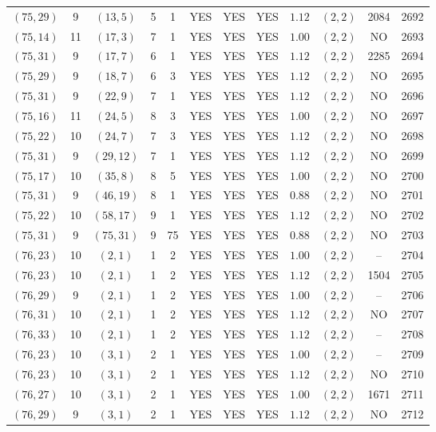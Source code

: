 \begin{longtable}{|c|c|c|c|c|c|c|c|c|c|c|c|}
$(75,29)$ & 9 & $(13,5)$ & 5 & 1 & YES & YES & YES & $1.12$ & $(2,2)$ & 2084 & 2692\\
$(75,14)$ & 11 & $(17,3)$ & 7 & 1 & YES & YES & YES & $1.00$ & $(2,2)$ & NO & 2693\\
$(75,31)$ & 9 & $(17,7)$ & 6 & 1 & YES & YES & YES & $1.12$ & $(2,2)$ & 2285 & 2694\\
$(75,29)$ & 9 & $(18,7)$ & 6 & 3 & YES & YES & YES & $1.12$ & $(2,2)$ & NO & 2695\\
$(75,31)$ & 9 & $(22,9)$ & 7 & 1 & YES & YES & YES & $1.12$ & $(2,2)$ & NO & 2696\\
$(75,16)$ & 11 & $(24,5)$ & 8 & 3 & YES & YES & YES & $1.00$ & $(2,2)$ & NO & 2697\\
$(75,22)$ & 10 & $(24,7)$ & 7 & 3 & YES & YES & YES & $1.12$ & $(2,2)$ & NO & 2698\\
$(75,31)$ & 9 & $(29,12)$ & 7 & 1 & YES & YES & YES & $1.12$ & $(2,2)$ & NO & 2699\\
$(75,17)$ & 10 & $(35,8)$ & 8 & 5 & YES & YES & YES & $1.00$ & $(2,2)$ & NO & 2700\\
$(75,31)$ & 9 & $(46,19)$ & 8 & 1 & YES & YES & YES & $0.88$ & $(2,2)$ & NO & 2701\\
$(75,22)$ & 10 & $(58,17)$ & 9 & 1 & YES & YES & YES & $1.12$ & $(2,2)$ & NO & 2702\\
$(75,31)$ & 9 & $(75,31)$ & 9 & 75 & YES & YES & YES & $0.88$ & $(2,2)$ & NO & 2703\\
$(76,23)$ & 10 & $(2,1)$ & 1 & 2 & YES & YES & YES & $1.00$ & $(2,2)$ & -- & 2704\\
$(76,23)$ & 10 & $(2,1)$ & 1 & 2 & YES & YES & YES & $1.12$ & $(2,2)$ & 1504 & 2705\\
$(76,29)$ & 9 & $(2,1)$ & 1 & 2 & YES & YES & YES & $1.00$ & $(2,2)$ & -- & 2706\\
$(76,31)$ & 10 & $(2,1)$ & 1 & 2 & YES & YES & YES & $1.12$ & $(2,2)$ & NO & 2707\\
$(76,33)$ & 10 & $(2,1)$ & 1 & 2 & YES & YES & YES & $1.12$ & $(2,2)$ & -- & 2708\\
$(76,23)$ & 10 & $(3,1)$ & 2 & 1 & YES & YES & YES & $1.00$ & $(2,2)$ & -- & 2709\\
$(76,23)$ & 10 & $(3,1)$ & 2 & 1 & YES & YES & YES & $1.12$ & $(2,2)$ & NO & 2710\\
$(76,27)$ & 10 & $(3,1)$ & 2 & 1 & YES & YES & YES & $1.00$ & $(2,2)$ & 1671 & 2711\\
$(76,29)$ & 9 & $(3,1)$ & 2 & 1 & YES & YES & YES & $1.12$ & $(2,2)$ & NO & 2712\\

\end{longtable}
